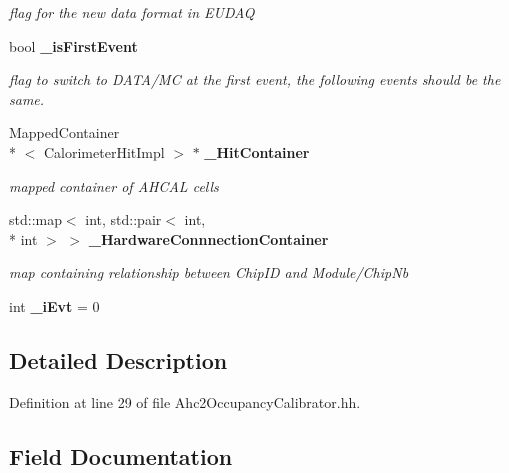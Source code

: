 \begin{DoxyCompactItemize}
\begin{DoxyCompactList}\small\item\em flag for the new data format in E\-U\-D\-A\-Q \end{DoxyCompactList}\item 
bool {\bf \-\_\-is\-First\-Event}
\begin{DoxyCompactList}\small\item\em flag to switch to D\-A\-T\-A/\-M\-C at the first event, the following events should be the same. \end{DoxyCompactList}\item 
Mapped\-Container\\*
$<$ Calorimeter\-Hit\-Impl $>$ $\ast$ {\bf \-\_\-\-Hit\-Container}\label{classCALICE_1_1Ahc2OccupancyCalibrator_a75f803b0e387a026e6394d1629f53442}

\begin{DoxyCompactList}\small\item\em mapped container of A\-H\-C\-A\-L cells \end{DoxyCompactList}\item 
std\-::map$<$ int, std\-::pair$<$ int, \\*
int $>$ $>$ {\bf \-\_\-\-Hardware\-Connnection\-Container}\label{classCALICE_1_1Ahc2OccupancyCalibrator_a59ac6fbccb3f906f284a1072e744ebc0}

\begin{DoxyCompactList}\small\item\em map containing relationship between Chip\-I\-D and Module/\-Chip\-Nb \end{DoxyCompactList}\item 
int {\bfseries \-\_\-i\-Evt} = 0\label{classCALICE_1_1Ahc2OccupancyCalibrator_a1e3aaa9c9d7c8a34191f3d7fe6dc80e0}

\end{DoxyCompactItemize}


\subsection{Detailed Description}


Definition at line 29 of file Ahc2\-Occupancy\-Calibrator.\-hh.



\subsection{Field Documentation}

